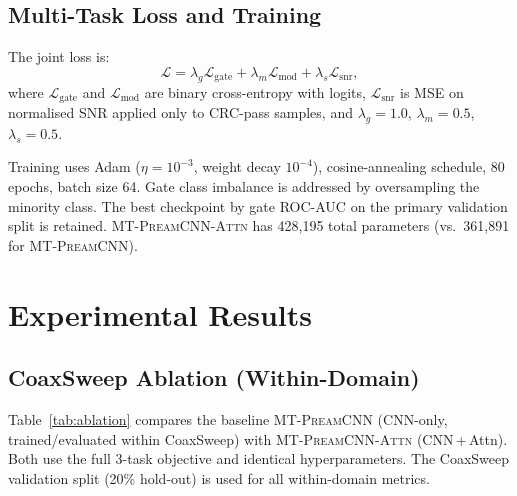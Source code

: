 \documentclass[conference]{IEEEtran}
\newcommand{\mtcnn}{\textsc{MT-PreamCNN}}
\newcommand{\mtcnnattn}{\textsc{MT-PreamCNN-Attn}}
\begin{document}
\subsection{Multi-Task Loss and Training}
\label{sec:loss}

The joint loss is:
\begin{equation}
  \mathcal{L} = \lambda_g \mathcal{L}_\text{gate}
              + \lambda_m \mathcal{L}_\text{mod}
              + \lambda_s \mathcal{L}_\text{snr},
\end{equation}
where $\mathcal{L}_\text{gate}$ and $\mathcal{L}_\text{mod}$ are
binary cross-entropy with logits, $\mathcal{L}_\text{snr}$ is MSE on
normalised SNR applied only to CRC-pass samples, and
$\lambda_g = 1.0$, $\lambda_m = 0.5$, $\lambda_s = 0.5$.

Training uses Adam ($\eta = 10^{-3}$, weight decay $10^{-4}$),
cosine-annealing schedule, 80 epochs, batch size 64.
Gate class imbalance is addressed by oversampling the minority class.
The best checkpoint by gate ROC-AUC on the primary validation split
is retained.
\mtcnnattn{} has 428{,}195 total parameters (vs.\ 361{,}891 for
\mtcnn{}).

\section{Experimental Results}
\label{sec:results}

\subsection{CoaxSweep Ablation (Within-Domain)}
\label{sec:ablation}

Table~\ref{tab:ablation} compares the baseline \mtcnn{} (CNN-only,
trained/evaluated within CoaxSweep) with \mtcnnattn{} (CNN\,+\,Attn).
Both use the full 3-task objective and identical hyperparameters.
The CoaxSweep validation split (20\% hold-out) is used for all
within-domain metrics.
\end{document}
